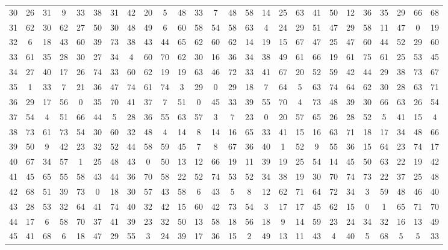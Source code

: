 \begin{table}
\begin{tabular}{c c c c c c c c c c c c c c c c c c c c c c c c c c }
30 & 26 & 31 & 9 & 33 & 38 & 31 & 42 & 20 & 5 & 48 & 33 & 7 & 48 & 58 & 14 & 25 & 63 & 41 & 50 & 12 & 36 & 35 & 29 & 66 & 68 \\
31 & 62 & 30 & 62 & 27 & 50 & 30 & 48 & 49 & 6 & 60 & 58 & 54 & 58 & 63 & 4 & 24 & 29 & 51 & 47 & 29 & 58 & 11 & 47 & 0 & 19 \\
32 & 6 & 18 & 43 & 60 & 39 & 73 & 38 & 43 & 44 & 65 & 62 & 60 & 62 & 14 & 19 & 15 & 67 & 47 & 25 & 47 & 60 & 44 & 52 & 29 & 60 \\
33 & 61 & 35 & 28 & 30 & 27 & 34 & 4 & 60 & 70 & 62 & 30 & 16 & 36 & 34 & 38 & 49 & 61 & 66 & 19 & 61 & 75 & 61 & 25 & 53 & 45 \\
34 & 27 & 40 & 17 & 26 & 74 & 33 & 60 & 62 & 19 & 19 & 63 & 46 & 72 & 33 & 41 & 67 & 20 & 52 & 59 & 42 & 44 & 29 & 38 & 73 & 67 \\
35 & 1 & 33 & 7 & 21 & 36 & 47 & 74 & 61 & 74 & 3 & 29 & 0 & 29 & 18 & 7 & 64 & 5 & 63 & 74 & 64 & 62 & 30 & 28 & 63 & 71 \\
36 & 29 & 17 & 56 & 0 & 35 & 70 & 41 & 37 & 7 & 51 & 0 & 45 & 33 & 39 & 55 & 70 & 4 & 73 & 48 & 39 & 30 & 66 & 63 & 26 & 54 \\
37 & 54 & 4 & 51 & 66 & 44 & 5 & 28 & 36 & 55 & 63 & 57 & 3 & 7 & 23 & 0 & 20 & 57 & 65 & 26 & 28 & 52 & 5 & 41 & 15 & 4 \\
38 & 73 & 61 & 73 & 54 & 30 & 60 & 32 & 48 & 4 & 14 & 8 & 14 & 16 & 65 & 33 & 41 & 15 & 16 & 63 & 71 & 18 & 17 & 34 & 48 & 66 \\
39 & 50 & 9 & 42 & 23 & 32 & 52 & 44 & 58 & 59 & 45 & 7 & 8 & 67 & 36 & 40 & 1 & 52 & 9 & 55 & 36 & 15 & 64 & 23 & 74 & 17 \\
40 & 67 & 34 & 57 & 1 & 25 & 48 & 43 & 0 & 50 & 13 & 12 & 66 & 19 & 11 & 39 & 19 & 25 & 54 & 14 & 45 & 50 & 63 & 22 & 19 & 42 \\
41 & 45 & 65 & 55 & 58 & 43 & 44 & 36 & 70 & 58 & 22 & 52 & 74 & 53 & 52 & 34 & 38 & 19 & 30 & 70 & 74 & 73 & 22 & 37 & 25 & 48 \\
42 & 68 & 51 & 39 & 73 & 0 & 18 & 30 & 57 & 43 & 58 & 6 & 43 & 5 & 8 & 12 & 62 & 71 & 64 & 72 & 34 & 3 & 59 & 48 & 46 & 40 \\
43 & 28 & 53 & 32 & 64 & 41 & 74 & 40 & 32 & 42 & 15 & 60 & 42 & 73 & 54 & 3 & 17 & 17 & 45 & 62 & 15 & 0 & 1 & 65 & 71 & 70 \\
44 & 17 & 6 & 58 & 70 & 37 & 41 & 39 & 23 & 32 & 50 & 13 & 58 & 18 & 56 & 18 & 9 & 14 & 59 & 23 & 24 & 34 & 32 & 16 & 13 & 49 \\
45 & 41 & 68 & 6 & 18 & 47 & 29 & 55 & 3 & 24 & 39 & 17 & 36 & 15 & 2 & 49 & 13 & 11 & 43 & 4 & 40 & 5 & 68 & 5 & 5 & 33 \\

\end{tabular}
\end{table}
